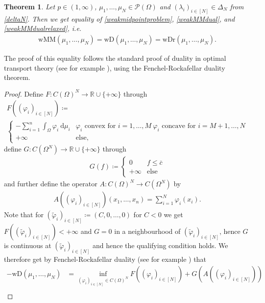 \documentclass[10pt,a4paper]{amsart}
\newcommand{\RR}{\mathbb{R}}
\newcommand{\dd}{\mathrm{d}}
\newtheorem{thm}{Theorem}[section]
\begin{document}
\begin{thm}\label{weakMMdualthm}
	Let $p\in (1,\infty)$,  $\mu_1,\dots,\mu_N\in\mathcal P(\Omega)$ and $(\lambda_i)_{i\in[N]}\in\Delta_N$ from \eqref{deltaN}. Then we get equality of \eqref{weakmidpointproblem}, \eqref{weakMMdual}, and \eqref{weakMMdualrelaxed}, i.e.
	\begin{gather*}
		\text{wMM}(\mu_1,\dots,\mu_N)=\text{wD}(\mu_1,\dots,\mu_N)=\text{wDr}(\mu_1,\dots,\mu_N).
	\end{gather*}
\end{thm}
The proof of this equality follows the standard proof of duality in optimal transport theory (see for example \cite[Thm 1.3]{villani2003}), using the Fenchel-Rockafellar duality theorem.
\begin{proof}
	Define $F:C(\Omega)^N\rightarrow\RR\cup\{+\infty\}$ through
	\begin{gather*}
		F((\varphi_i)_{i\in[N]})\coloneqq\\
		\begin{cases}
			-\sum_{i=1}^n\int_\Omega\varphi_i\ \dd\mu_i&\varphi_i\text{ convex for }i=1,\dots,M\ \varphi_i\text{ concave for }i=M+1,\dots,N\\
			+\infty&\text{else,}
		\end{cases}
	\end{gather*}
	define $G:C(\Omega^N)\rightarrow\RR\cup\{+\infty\}$ through
	\begin{gather*}
		G(f)\coloneqq
		\begin{cases}
			0&f\leq \bar c\\
			+\infty&\text{else}
		\end{cases}
	\end{gather*}
	and further define the operator $A:C(\Omega)^N\rightarrow C(\Omega^N)$ by
	\begin{gather*}
		A((\varphi_i)_{i\in[N]})(x_1,\dots,x_n)=\sum_{i=1}^N\varphi_i(x_i).
	\end{gather*}
	Note that for $(\tilde\varphi_i)_{i\in[N]}\coloneqq(C,0,\dots,0)$ for $C<0$ we get
	$F((\tilde\varphi_i)_{i\in[N]})<+\infty$ and $G=0$ in a neighbourhood of $(\tilde\varphi_i)_{i\in[N]}$, hence $G$ is continuous at $(\tilde\varphi_i)_{i\in[N]}$ and hence the qualifying condition holds.
	We therefore get by Fenchel-Rockafellar duality (see for example \cite[Thm 4.1, Rmk 4.2]{ekeland1976}) that
	\begin{align*}
		-\text{wD}(\mu_1,\dots,\mu_N)&=\inf_{(\varphi_i)_{i\in[N]}\in C(\Omega)^N} F((\varphi_i)_{i\in[N]})+ G(A((\varphi_i)_{i\in[N]}))\\

\end{align*}
\end{proof}
\end{document}
